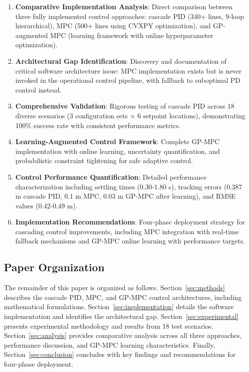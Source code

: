\documentclass[journal]{IEEEtran}
\begin{document}
\begin{enumerate}
    \item \textbf{Comparative Implementation Analysis}: Direct comparison between three fully implemented control approaches: cascade PID (340+ lines, 9-loop hierarchical), MPC (500+ lines using CVXPY optimization), and GP-augmented MPC (learning framework with online hyperparameter optimization).
    
    \item \textbf{Architectural Gap Identification}: Discovery and documentation of critical software architecture issue: MPC implementation exists but is never invoked in the operational control pipeline, with fallback to suboptimal PD control instead.
    
    \item \textbf{Comprehensive Validation}: Rigorous testing of cascade PID across 18 diverse scenarios (3 configuration sets × 6 setpoint locations), demonstrating 100\% success rate with consistent performance metrics.
    
    \item \textbf{Learning-Augmented Control Framework}: Complete GP-MPC implementation with online learning, uncertainty quantification, and probabilistic constraint tightening for safe adaptive control.
    
    \item \textbf{Control Performance Quantification}: Detailed performance characterization including settling times (0.30-1.80 s), tracking errors (0.387 m cascade PID, 0.1 m MPC, 0.03 m GP-MPC after learning), and RMSE values (0.42-0.49 m).
    
    \item \textbf{Implementation Recommendations}: Four-phase deployment strategy for cascading control improvements, including MPC integration with real-time fallback mechanisms and GP-MPC online learning with performance targets.
\end{enumerate}

\subsection{Paper Organization}

The remainder of this paper is organized as follows. Section~\ref{sec:methods} describes the cascade PID, MPC, and GP-MPC control architectures, including mathematical formulations. Section~\ref{sec:implementation} details the software implementation and identifies the architectural gap. Section~\ref{sec:experimental} presents experimental methodology and results from 18 test scenarios. Section~\ref{sec:analysis} provides comparative analysis across all three approaches, performance discussion, and GP-MPC learning characteristics. Finally, Section~\ref{sec:conclusion} concludes with key findings and recommendations for four-phase deployment.
\end{document}
